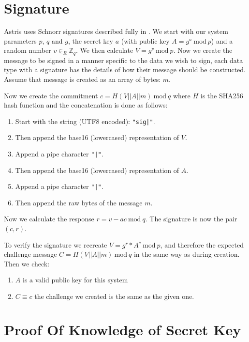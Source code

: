 \section*{Signature}
\label{proc:sign}

Astris uses Schnorr signatures described fully in . We start with our system parameters $p$, $q$ and $g$, the secret key $a$ (with public key  $A = g^a\ \textrm{mod}\ p$) and a random number $v \in_R \mathbb{Z}_q$. We then calculate $V = g^v\ \textrm{mod}\ p$. Now we create the message to be signed in a manner specific to the data we wish to sign, each data type with a signature has the details of how their message should be constructed. Assume that message is created as an array of bytes: $m$.

Now we create the commitment $c = H(V || A || m)\ \textrm{mod}\ q$ where $H$ is the SHA256 hash function and the concatenation is done as follows:

\begin{enumerate}
    \item Start with the string (UTF8 encoded): \lstinline[style=ES6]{"sig|"}.
    \item Then append the base16 (lowercased) representation of $V$.
    \item Append a pipe character \lstinline[style=ES6]{"|"}.
    \item Then append the base16 (lowercased) representation of $A$.
    \item Append a pipe character \lstinline[style=ES6]{"|"}.
    \item Then append the raw bytes of the message $m$.
\end{enumerate}

Now we calculate the response $r = v - ac\ \textrm{mod}\ q$. The signature is now the pair $(c, r)$.

To verify the signature we recreate $V = g^r * A^c\ \textrm{mod}\ p$, and therefore the expected challenge message $C = H(V || A || m)\ \textrm{mod}\ q$ in the same way as during creation. Then we check:

\begin{enumerate}
    \item $A$ is a valid public key for this system
    \item $C \equiv c$ the challenge we created is the same as the given one.
\end{enumerate}

\section*{Proof Of Knowledge of Secret Key}
\label{proc:pok}

